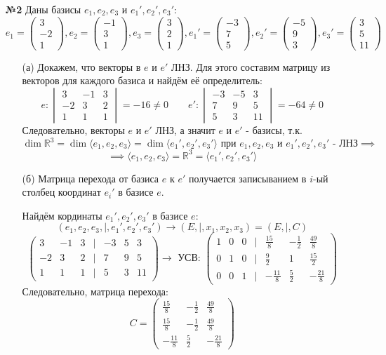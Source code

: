 \documentclass[a4paper]{article}
\newcommand{\mat}[1]{\begin{pmatrix} #1 \end{pmatrix}}
\renewcommand{\det}[1]{\begin{vmatrix} #1 \end{vmatrix}}
\newcommand{\RR}{\mathbb{R}}
\begin{document}
\begin{enumerate}
    \item[\textbf{№2}]Даны базисы $e_1, e_2, e_3$ и $e_1', e_2', e_3'$:
    $$e_1 = \mat{3\\-2\\1}, e_2=\mat{-1\\3\\1}, e_3=\mat{3\\2\\1}, e_1' = \mat{-3\\7\\5}, e_2' = \mat{-5\\9\\3}, e_3'=\mat{3\\5\\11}$$
    \begin{enumerate}
        \item[(а)] Докажем, что векторы в $e$ и $e'$ ЛНЗ. Для этого составим матрицу из векторов для каждого базиса и найдём её определитель:
        $$e: \det{3 & -1 & 3 \\ -2 & 3 & 2\\ 1 &1 & 1} = -16 \neq 0 \quad \quad e':\det{-3 & -5 &3 \\ 7 &9 & 5 \\ 5 & 3 &11}=-64\neq 0$$
        Следовательно, векторы $e$ и $e'$ ЛНЗ, а значит $e$ и $e'$ - базисы, т.к. 
        $$\dim \RR^3 = \dim \langle e_1, e_2, e_3\rangle = \dim \langle e_1', e_2', e_3'\rangle \text{ при $e_1, e_2, e_3$ и $e_1', e_2', e_3'$ - ЛНЗ} \implies$$
        $$\implies \langle e_1, e_2, e_3\rangle = \RR^3 = \langle e_1', e_2', e_3'\rangle$$
        
        \item[(б)]Матрица перехода от базиса $e$ к $e'$ получается записыванием в $i$-ый столбец координат $e_i'$ в базисе $e$.
        
        Найдём кординаты $e_1', e_2', e_3'$ в базисе $e$:
        $$(e_1, e_2, e_3, |, e_1',e_2', e_3') \to (E, |, x_1, x_2, x_3) = (E, |, C)$$
        $$\mat{3 & -1 & 3 &|&-3&5&3\\ -2 & 3 & 2&|&7&9&5\\ 1 &1 & 1&|&5&3&11} \to \text{ УСВ: } \begin{pmatrix}
            1 & 0 & 0 & | & \frac{15}{8} & -\frac{1}{2} & \frac{49}{8} \\
            0 & 1 & 0 & | & \frac{9}{2} & 1 & \frac{15}{2} \\
            0 & 0 & 1 & | & -\frac{11}{8} & \frac{5}{2} & -\frac{21}{8}
            \end{pmatrix}$$
        Следовательно, матрица перехода:
        $$C = \mat{\frac{15}{8} & -\frac{1}{2} & \frac{49}{8}\\
        \frac{15}{8} & -\frac{1}{2} & \frac{49}{8} \\
        -\frac{11}{8} & \frac{5}{2} & -\frac{21}{8}}$$\\


\end{enumerate}
\end{enumerate}
\end{document}
